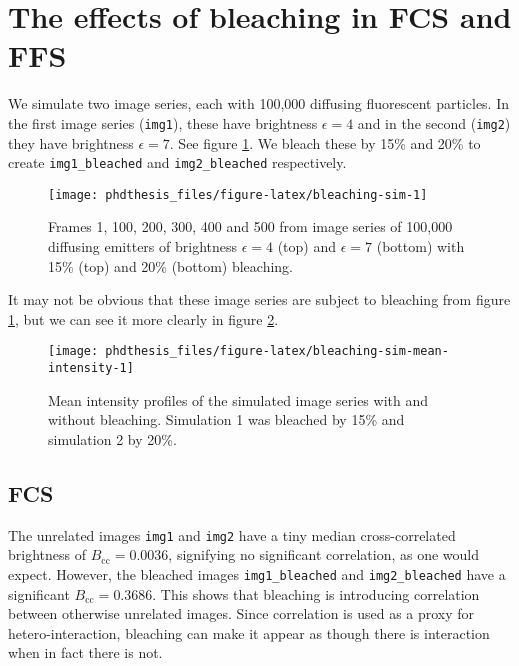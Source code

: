\documentclass[12pt,]{book}
\theoremstyle{definition}
\theoremstyle{definition}
\theoremstyle{definition}
\theoremstyle{remark}
\begin{document}
\section{The effects of bleaching in FCS and
FFS}\label{the-effects-of-bleaching-in-fcs-and-ffs}

We simulate two image series, each with 100,000 diffusing fluorescent
particles. In the first image series (\texttt{img1}), these have
brightness \(\epsilon = 4\) and in the second (\texttt{img2}) they have
brightness \(\epsilon = 7\). See figure \ref{fig:bleaching-sim}. We
bleach these by 15\% and 20\% to create \texttt{img1\_bleached} and
\texttt{img2\_bleached} respectively.






\begin{figure}

\texttt{[image: phdthesis\_files/figure-latex/bleaching-sim-1]} \hfill{}

\caption{Frames 1, 100, 200, 300, 400 and 500 from
image series of 100,000 diffusing emitters of brightness
\(\epsilon = 4\) (top) and \(\epsilon = 7\) (bottom) with 15\% (top) and
20\% (bottom) bleaching.}\label{fig:bleaching-sim}
\end{figure}

It may not be obvious that these image series are subject to bleaching
from figure \ref{fig:bleaching-sim}, but we can see it more clearly in
figure \ref{fig:bleaching-sim-mean-intensity}.





\begin{figure}

\texttt{[image: phdthesis\_files/figure-latex/bleaching-sim-mean-intensity-1]} \hfill{}

\caption{Mean intensity profiles of
the simulated image series with and without bleaching. Simulation 1 was
bleached by 15\% and simulation 2 by 20\%.}\label{fig:bleaching-sim-mean-intensity}
\end{figure}

\subsection{FCS}\label{fcs}

The unrelated images \texttt{img1} and \texttt{img2} have a tiny median
cross-correlated brightness of \(B_\text{cc} = 0.0036\), signifying no
significant correlation, as one would expect. However, the bleached
images \texttt{img1\_bleached} and \texttt{img2\_bleached} have a
significant \(B_\text{cc} = 0.3686\). This shows that bleaching is
introducing correlation between otherwise unrelated images. Since
correlation is used as a proxy for hetero-interaction, bleaching can
make it appear as though there is interaction when in fact there is not.
\end{document}
